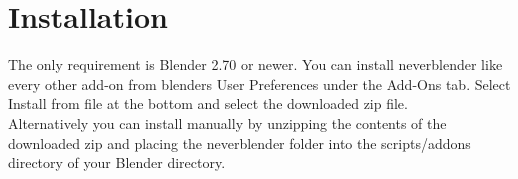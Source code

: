 \section{Installation}
The only requirement is Blender 2.70 or newer. You can install neverblender
like every other add-on from blenders User Preferences under the Add-Ons tab.
Select Install from file at the bottom and select the downloaded zip file. \\

Alternatively you can install manually by unzipping the contents of the
downloaded zip and placing the neverblender folder into the scripts/addons
directory of your Blender directory.
